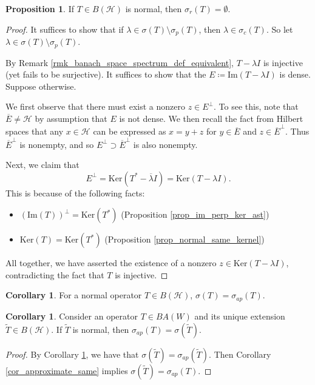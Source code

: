 \documentclass{dcthesis}
\numberwithin{equation}{section}
\numberwithin{equation}{section}
\theoremstyle{definition}
\newtheorem{proposition}[equation]{Proposition}
\newtheorem{corollary}[equation]{Corollary}
\begin{document}
\begin{proposition}
\label{prop_normal_residual_empty}
	If $T\in B(\mathcal{H})$ is normal, then $\sigma_r(T)=\emptyset$.
\end{proposition}
\begin{proof}
	It suffices to show that if $\lambda\in \sigma(T)\setminus\sigma_p(T)$, then $\lambda\in\sigma_c(T)$. So let $\lambda\in \sigma(T)\setminus\sigma_p(T)$.

	By Remark \ref{rmk_banach_space_spectrum_def_equivalent}, $T-\lambda I$ is injective (yet fails to be surjective). It suffices to show that the $E\coloneqq \text{Im}(T-\lambda I)$ is dense. Suppose otherwise. 

	We first observe that there must exist a nonzero $z\in E^\perp$. To see this, note that $\overline{E}\neq \mathcal{H}$ by assumption that $E$ is not dense. We then recall the fact from Hilbert spaces that any $x\in\mathcal{H}$ can be expressed as $x=y+z$ for $y\in \overline{E}$ and $z\in \overline{E}^\perp$. Thus $\overline{E}^\perp$ is nonempty, and so $E^\perp \supset \overline{E}^\perp$ is also nonempty.

	Next, we claim that
	\begin{equation*}
		E^\perp = \text{Ker}(T^\ast - \overline{\lambda}I)= \text{Ker}(T-\lambda I).
	\end{equation*}
	This is because of the following facts:
	\begin{itemize}
		\item $(\text{Im}(T))^\perp = \text{Ker}(T^\ast)$ (Proposition \ref{prop_im_perp_ker_ast})
		\item $\text{Ker}(T)=\text{Ker}(T^\ast)$ (Proposition \ref{prop_normal_same_kernel})
	\end{itemize}

	All together, we have asserted the existence of a nonzero $z\in\text{Ker}(T-\lambda I)$, contradicting the fact that $T$ is injective.
\end{proof}

\begin{corollary}
\label{cor_normal_spectrum_is_approx}
	For a normal operator $T\in B(\mathcal{H})$, $\sigma(T)=\sigma_{ap}(T)$.
\end{corollary}

\begin{corollary}
	Consider an operator $T\in BA(W)$ and its unique extension $\tilde{T}\in B(\mathcal{H})$. If $\tilde{T}$ is normal, then $\sigma_{ap}(T)=\sigma(\tilde{T})$.
\end{corollary}
\begin{proof}
	By Corollary \ref{cor_normal_spectrum_is_approx}, we have that $\sigma(\tilde{T})=\sigma_{ap}(\tilde{T})$. Then Corollary \ref{cor_approximate_same} implies $\sigma(\tilde{T}) = \sigma_{ap}(T)$.
\end{proof}
\end{document}
